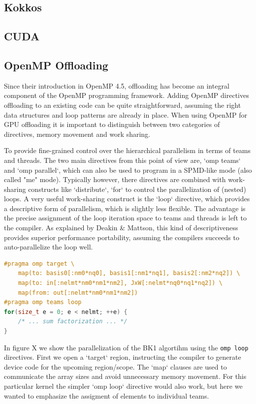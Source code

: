 \documentclass[a4paper,12pt]{article}
\begin{document}
\subsection{Kokkos}
\subsection{CUDA}
\subsection{OpenMP Offloading}

Since their introduction in OpenMP 4.5, offloading has become an integral component
of the OpenMP programming framework.
Adding OpenMP directives offloading to an existing code can be quite straightforward,
assuming the right data structures and loop patterns are already in place.
When using OpenMP for GPU offloading it is important to distinguish between two
categories of directives, memory movement and work sharing.

To provide fine-grained control over the hierarchical parallelism in terms of 
teams and threads. The two main directives from this point of view are, `omp teams` and `omp parallel`, which can also be used to program in a SPMD-like mode (also called "me" mode). Typically however, there directives are combined with work-sharing
constructs like `distribute`, `for` to control the parallelization of (nested) loops.
A very useful work-sharing construct is the `loop` directive, which provides 
a descriptive form of parallelism, which is slightly less flexible.
The advantage is the precise assignment of the loop iteration space to teams and threads is left to the compiler. 
As explained by Deakin \& Mattson, this kind of descriptiveness provides
superior performance portability, assuming the compilers succeeds to auto-parallelize
the loop well.

\begin{lstlisting}[language=C++,caption={Simple C++ hello world},label={lst:cpp-hello}]
#pragma omp target \
    map(to: basis0[:nm0*nq0], basis1[:nm1*nq1], basis2[:nm2*nq2]) \
    map(to: in[:nelmt*nm0*nm1*nm2], JxW[:nelmt*nq0*nq1*nq2]) \
    map(from: out[:nelmt*nm0*nm1*nm2])
#pragma omp teams loop
for(size_t e = 0; e < nelmt; ++e) {
    /* ... sum factorization ... */
}
\end{lstlisting}

In figure X we show the parallelization of the BK1 algortihm using the \texttt{omp loop} directives. First we open a `target` region, instructing the compiler to generate
device code for the upcoming region/scope. The `map` clauses are used to communicate the
array sizes and avoid unnecessary memory movement.
For this particular kernel the simpler `omp loop` directive would also work, but here we wanted
to emphasize the assigment of elements to individual teams.
\end{document}
